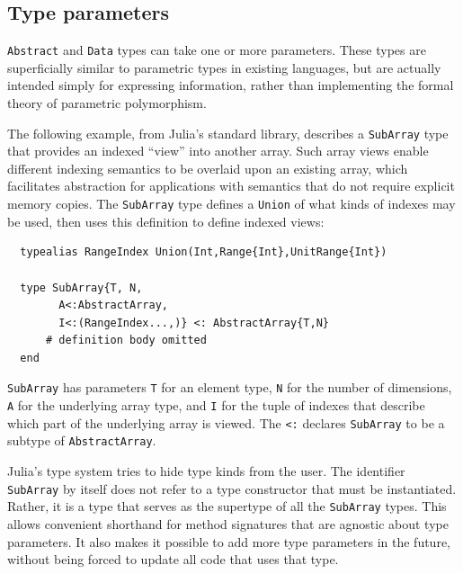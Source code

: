 \documentclass[10pt, preprint]{sigplanconf}
\begin{document}


\subsection{Type parameters}
\label{sec:typeparameters}

\verb|Abstract| and \verb|Data| types can take one or more parameters. These
types are superficially similar to parametric types in existing
languages, but are actually intended simply for expressing information, rather
than implementing the formal theory of parametric polymorphism.

The following example, from Julia's standard library, describes a \verb|SubArray|
type that provides an indexed ``view'' into another array. Such array views
enable different indexing semantics to be overlaid upon an existing array,
which facilitates abstraction for applications with semantics that do not
require explicit memory copies. The \verb|SubArray| type
defines a \verb|Union| of what kinds of indexes may be used, then uses this
definition to define indexed views:

\begin{lstlisting}
  typealias RangeIndex Union(Int,Range{Int},UnitRange{Int})

  type SubArray{T, N,
		A<:AbstractArray,
		I<:(RangeIndex...,)} <: AbstractArray{T,N}
      # definition body omitted
  end
\end{lstlisting}
%
\verb|SubArray| has parameters \verb|T| for an element type, \verb|N| for the
number of dimensions, \verb|A| for the underlying array type, and \verb|I|
for the tuple of indexes that describe which part of the underlying array
is viewed. The \verb|<:| declares \verb|SubArray| to be a subtype of
\verb|AbstractArray|.

Julia's type system tries to hide type kinds from
the user. The identifier \verb|SubArray| by itself does not refer to a
type constructor that must be instantiated. Rather, it is a type
that serves as the supertype of all the \verb|SubArray| types. This allows
convenient shorthand for method signatures that are agnostic about type parameters.
It also makes it possible to add more type parameters in the future, without
being forced to update all code that uses that type.
\end{document}
